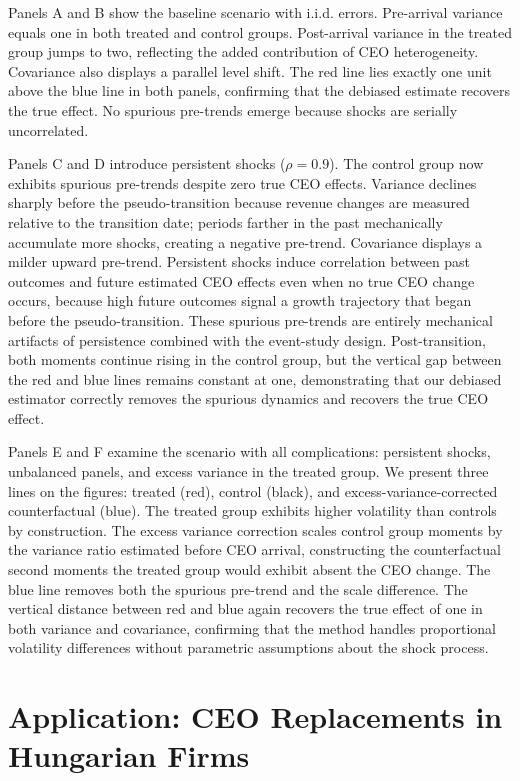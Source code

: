 \documentclass[11pt,a4paper]{article}
\begin{document}
Panels A and B show the baseline scenario with i.i.d. errors. Pre-arrival variance equals one in both treated and control groups. Post-arrival variance in the treated group jumps to two, reflecting the added contribution of CEO heterogeneity. Covariance also displays a parallel level shift. The red line lies exactly one unit above the blue line in both panels, confirming that the debiased estimate recovers the true effect. No spurious pre-trends emerge because shocks are serially uncorrelated. 

Panels C and D introduce persistent shocks ($\rho=0.9$). The control group now exhibits spurious pre-trends despite zero true CEO effects. Variance declines sharply before the pseudo-transition because revenue changes are measured relative to the transition date; periods farther in the past mechanically accumulate more shocks, creating a negative pre-trend. Covariance displays a milder upward pre-trend. Persistent shocks induce correlation between past outcomes and future estimated CEO effects even when no true CEO change occurs, because high future outcomes signal a growth trajectory that began before the pseudo-transition. These spurious pre-trends are entirely mechanical artifacts of persistence combined with the event-study design. Post-transition, both moments continue rising in the control group, but the vertical gap between the red and blue lines remains constant at one, demonstrating that our debiased estimator correctly removes the spurious dynamics and recovers the true CEO effect.

Panels E and F examine the scenario with all complications: persistent shocks, unbalanced panels, and excess variance in the treated group. We present three lines on the figures: treated (red), control (black), and excess-variance-corrected counterfactual (blue). The treated group exhibits higher volatility than controls by construction. The excess variance correction scales control group moments by the variance ratio estimated before CEO arrival, constructing the counterfactual second moments the treated group would exhibit absent the CEO change. The blue line removes both the spurious pre-trend and the scale difference. The vertical distance between red and blue again recovers the true effect of one in both variance and covariance, confirming that the method handles proportional volatility differences without parametric assumptions about the shock process.


\section{Application: CEO Replacements in Hungarian Firms}\label{sec:application}
\end{document}
